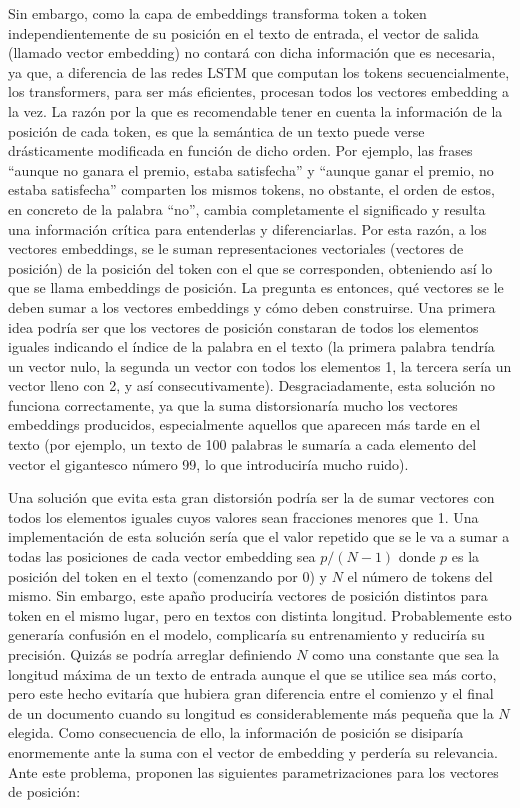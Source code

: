 Sin embargo, como la capa de embeddings transforma token a token independientemente de su posición en el texto de entrada, el vector de salida (llamado vector embedding) no contará con dicha información que es necesaria, ya que, a diferencia de las redes LSTM que computan los tokens secuencialmente, los transformers, para ser más eficientes, procesan todos los vectores embedding a la vez. La razón por la que es recomendable tener en cuenta la información de la posición de cada token, es que la semántica de un texto puede verse drásticamente modificada en función de dicho orden. Por ejemplo, las frases ``aunque no ganara el premio, estaba satisfecha'' y ``aunque ganar el premio, no estaba satisfecha'' comparten los mismos tokens, no obstante, el orden de estos, en concreto de la palabra ``no'', cambia completamente el significado y resulta una información crítica para entenderlas y diferenciarlas. Por esta razón, a los vectores embeddings, se le suman representaciones vectoriales (vectores de posición) de la posición del token con el que se corresponden, obteniendo así lo que se llama embeddings de posición. La pregunta es entonces, qué vectores se le deben sumar a los vectores embeddings y cómo deben construirse. Una primera idea podría ser que los vectores de posición constaran de todos los elementos iguales indicando el índice de la palabra en el texto (la primera palabra tendría un vector nulo, la segunda un vector con todos los elementos 1, la tercera sería un vector lleno con 2, y así consecutivamente). Desgraciadamente, esta solución no funciona correctamente, ya que la suma distorsionaría mucho los vectores embeddings producidos, especialmente aquellos que aparecen más tarde en el texto (por ejemplo, un texto de 100 palabras le sumaría a cada elemento del vector el gigantesco número 99, lo que introduciría mucho ruido).

Una solución que evita esta gran distorsión podría ser la de sumar vectores con todos los elementos iguales cuyos valores sean fracciones menores que 1. Una implementación de esta solución sería que el valor repetido que se le va a sumar a todas las posiciones de cada vector embedding sea $p/(N-1)$ donde $p$ es la posición del token en el texto (comenzando por 0) y $N$ el número de tokens del mismo. Sin embargo, este apaño produciría vectores de posición distintos para token en el mismo lugar, pero en textos con distinta longitud. Probablemente esto generaría confusión en el modelo, complicaría su entrenamiento y reduciría su precisión. Quizás se podría arreglar definiendo $N$ como una constante que sea la longitud máxima de un texto de entrada aunque el que se utilice sea más corto, pero este hecho evitaría que hubiera gran diferencia entre el comienzo y el final de un documento cuando su longitud es considerablemente más pequeña que la $N$ elegida. Como consecuencia de ello, la información de posición se disiparía enormemente ante la suma con el vector de embedding y perdería su relevancia. Ante este problema, \cite{transformers} proponen las siguientes parametrizaciones para los vectores de posición:

